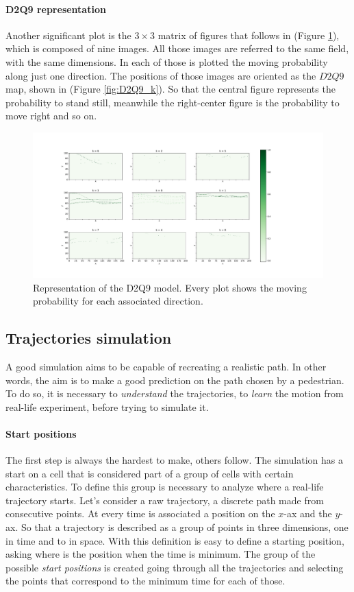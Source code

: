 \documentclass[class=article, crop=false]{standalone}
\begin{document}
\paragraph{D2Q9 representation}
Another significant plot is the $3\times3$ matrix of figures that follows in (Figure \ref{fig:5pids_D2Q9}), which is composed of nine images.
All those images are referred to the same field, with the same dimensions.
In each of those is plotted the moving probability along just one direction.
The positions of those images are oriented as the $D2Q9$ map, shown in (Figure \ref{fig:D2Q9_k}).
So that the central figure represents the probability to stand still, meanwhile the right-center figure is the probability to move right and so on.
\begin{figure}[h]
\centering
\includegraphics[scale=0.35]{fig/5pids/figure_trainf10_few_trajectories_Dx200_Dy100_D2Q9}
\captionsetup{width=.6\linewidth}
\caption{Representation of the D2Q9 model. Every plot shows the moving probability for each associated direction.}
\label{fig:5pids_D2Q9}
\end{figure}


\FloatBarrier
\subsection{Trajectories simulation}
A good simulation aims to be capable of recreating a realistic path.
In other words, the aim is to make a good prediction on the path chosen by a pedestrian.
To do so, it is necessary to \emph{understand} the trajectories, to \emph{learn} the motion from real-life experiment, before trying to simulate it.

\paragraph{Start positions}
The first step is always the hardest to make, others follow.
The simulation has a start on a cell that is considered part of a group of cells with certain characteristics.
To define this group is necessary to analyze where a real-life trajectory starts.
Let's consider a raw trajectory, a discrete path made from consecutive points.
At every time is associated a position on the $x$-ax and the $y$-ax.
So that a trajectory is described as a group of points in three dimensions, one in time and to in space.
With this definition is easy to define a starting position, asking where is the position when the time is minimum.
The group of the possible \emph{start positions} is created going through all the trajectories and selecting the points that correspond to the minimum time for each of those.
\end{document}
